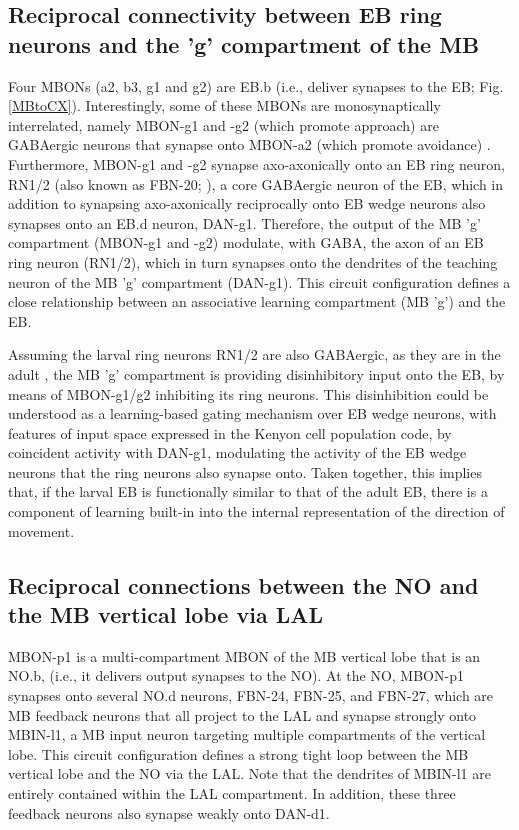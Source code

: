     \subsection{Reciprocal connectivity between EB ring neurons and the 'g' compartment of the MB}

    Four MBONs (a2, b3, g1 and g2) are EB.b (i.e., deliver synapses to the EB; Fig. \ref{MBtoCX}). Interestingly, some of these MBONs are monosynaptically interrelated, namely MBON-g1 and -g2 (which promote approach) are GABAergic neurons that synapse onto MBON-a2 (which promote avoidance) \citep{eschbach2021circuits}.
    Furthermore, MBON-g1 and -g2 synapse axo-axonically onto an EB ring neuron, RN1/2 (also known as FBN-20; \citep{eschbach2021circuits}), a core GABAergic neuron of the EB, which in addition to synapsing axo-axonically reciprocally onto EB wedge neurons also synapses onto an EB.d neuron, DAN-g1.
    Therefore, the output of the MB 'g' compartment (MBON-g1 and -g2) modulate, with GABA, the axon of an EB ring neuron (RN1/2), which in turn synapses onto the dendrites of the teaching neuron of the MB 'g' compartment (DAN-g1).  This circuit configuration defines a close relationship between an associative learning compartment (MB 'g') and the EB.

    Assuming the larval ring neurons RN1/2 are also GABAergic, as they are in the adult \citep{hanesch1989neuronal}, the MB 'g' compartment is providing disinhibitory input onto the EB, by means of MBON-g1/g2 inhibiting its ring neurons.
    This disinhibition could be understood as a learning-based gating mechanism over EB wedge neurons, with features of input space expressed in the Kenyon cell population code, by coincident activity with DAN-g1, modulating the activity of the EB wedge neurons that the ring neurons also synapse onto.
    Taken together, this implies that, if the larval EB is functionally similar to that of the adult EB, there is a component of learning built-in into the internal representation of the direction of movement.
    
    \subsection{Reciprocal connections between the NO and the MB vertical lobe via LAL}
    MBON-p1 is a multi-compartment MBON of the MB vertical lobe that is an NO.b, (i.e., it delivers output synapses to the NO).
    At the NO, MBON-p1 synapses onto several NO.d neurons, FBN-24, FBN-25, and FBN-27, which are MB feedback neurons \citep{eschbach2020recurrent} that all project to the LAL and synapse strongly onto MBIN-l1, a MB input neuron targeting multiple compartments of the vertical lobe.
    This circuit configuration defines a strong tight loop between the MB vertical lobe and the NO via the LAL.  Note that the dendrites of MBIN-l1 are entirely contained within the LAL compartment.
    In addition, these three feedback neurons also synapse weakly onto DAN-d1.

